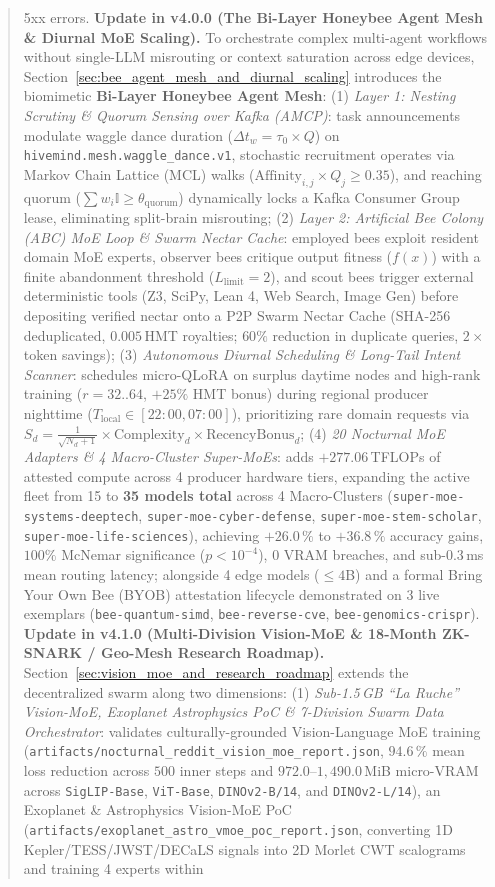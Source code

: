 \documentclass[11pt,a4paper]{article}
\begin{document}
\begin{abstract}
5xx errors. \textbf{Update in v4.0.0 (The Bi-Layer Honeybee Agent Mesh \& Diurnal MoE Scaling).} To orchestrate complex multi-agent workflows without single-LLM misrouting or context saturation across edge devices, Section~\ref{sec:bee_agent_mesh_and_diurnal_scaling} introduces the biomimetic \textbf{Bi-Layer Honeybee Agent Mesh}: (1) \emph{Layer 1: Nesting Scrutiny \& Quorum Sensing over Kafka (AMCP)}: task announcements modulate waggle dance duration ($\Delta t_w = \tau_0 \times Q$) on \texttt{hivemind.mesh.waggle\_dance.v1}, stochastic recruitment operates via Markov Chain Lattice (MCL) walks ($\text{Affinity}_{i,j} \times Q_j \ge 0.35$), and reaching quorum ($\sum w_i \mathbb{I} \ge \theta_{\text{quorum}}$) dynamically locks a Kafka Consumer Group lease, eliminating split-brain misrouting; (2) \emph{Layer 2: Artificial Bee Colony (ABC) MoE Loop \& Swarm Nectar Cache}: employed bees exploit resident domain MoE experts, observer bees critique output fitness ($f(x)$) with a finite abandonment threshold ($L_{\text{limit}} = 2$), and scout bees trigger external deterministic tools (Z3, SciPy, Lean 4, Web Search, Image Gen) before depositing verified nectar onto a P2P Swarm Nectar Cache (SHA-256 deduplicated, $0.005$\,HMT royalties; $60\%$ reduction in duplicate queries, $2\times$ token savings); (3) \emph{Autonomous Diurnal Scheduling \& Long-Tail Intent Scanner}: schedules micro-QLoRA on surplus daytime nodes and high-rank training ($r=32..64$, $+25\%$ HMT bonus) during regional producer nighttime ($T_{\text{local}} \in [22:00, 07:00]$), prioritizing rare domain requests via $S_d = \frac{1}{\sqrt{N_d+1}} \times \text{Complexity}_d \times \text{RecencyBonus}_d$; (4) \emph{20 Nocturnal MoE Adapters \& 4 Macro-Cluster Super-MoEs}: adds $+277.06$\,TFLOPs of attested compute across 4 producer hardware tiers, expanding the active fleet from 15 to \textbf{35 models total} across 4 Macro-Clusters (\texttt{super-moe-systems-deeptech}, \texttt{super-moe-cyber-defense}, \texttt{super-moe-stem-scholar}, \texttt{super-moe-life-sciences}), achieving $+26.0\,\%$ to $+36.8\,\%$ accuracy gains, $100\%$ McNemar significance ($p < 10^{-4}$), $0$ VRAM breaches, and sub-$0.3$\,ms mean routing latency; alongside 4 edge models ($\le 4$B) and a formal Bring Your Own Bee (BYOB) attestation lifecycle demonstrated on 3 live exemplars (\texttt{bee-quantum-simd}, \texttt{bee-reverse-cve}, \texttt{bee-genomics-crispr}). \textbf{Update in v4.1.0 (Multi-Division Vision-MoE \& 18-Month ZK-SNARK / Geo-Mesh Research Roadmap).} Section~\ref{sec:vision_moe_and_research_roadmap} extends the decentralized swarm along two dimensions: (1) \emph{Sub-1.5\,GB ``La Ruche'' Vision-MoE, Exoplanet Astrophysics PoC \& 7-Division Swarm Data Orchestrator}: validates culturally-grounded Vision-Language MoE training (\texttt{artifacts/nocturnal\_reddit\_vision\_moe\_report.json}, $94.6\,\%$ mean loss reduction across $500$ inner steps and $972.0\text{--}1{,}490.0$\,MiB micro-VRAM across \texttt{SigLIP-Base}, \texttt{ViT-Base}, \texttt{DINOv2-B/14}, and \texttt{DINOv2-L/14}), an Exoplanet \& Astrophysics Vision-MoE PoC (\texttt{artifacts/exoplanet\_astro\_vmoe\_poc\_report.json}, converting 1D Kepler/TESS/JWST/DECaLS signals into 2D Morlet CWT scalograms and training 4 experts within 
\end{abstract}
\end{document}
